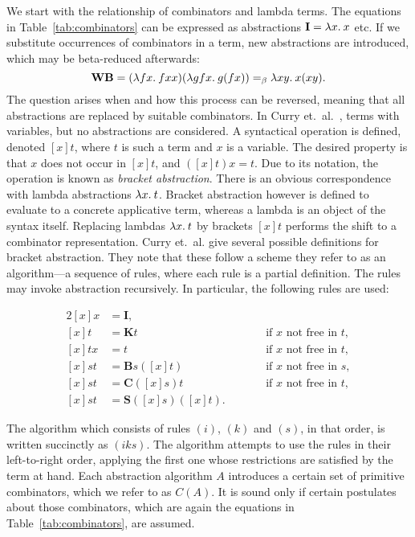 We start with the relationship of combinators and lambda terms.
The equations in Table~\ref{tab:combinators} can be expressed as abstractions
$\mathbf{I} = \lambda x.\>x$ etc.
If we substitute occurrences of combinators in a term, new abstractions are
introduced, which may be beta-reduced afterwards:
\[ \mathbf{WB} = (\lambda fx.\>fxx)(\lambda gfx.\>g(fx)) =_\beta \lambda xy.\>x(xy). \]
The question arises when and how this process can be reversed, meaning that
all abstractions are replaced by suitable combinators.
In Curry et.~al.~\cite[Section~6A]{curry68}, terms with variables, but no
abstractions are considered.
A syntactical operation is defined, denoted $[x]t$, where $t$ is such a term
and $x$ is a variable.
The desired property is that $x$ does not occur in $[x]t$, and
$([x]t)x = t$.  %
Due to its notation, the operation is known as \emph{bracket abstraction}.
There is an obvious correspondence with lambda abstractions $\lambda x.\>t$.
Bracket abstraction however is defined to evaluate to a concrete applicative
term, whereas a lambda is an object of the syntax itself. %
Replacing lambdas $\lambda x.\>t$ by brackets $[x]t$ performs the shift to a
combinator representation.
Curry et.\ al. give several possible definitions for bracket abstraction.
They note that these follow a scheme they refer to as an algorithm---a sequence
of rules, where each rule is a partial definition.
The rules may invoke abstraction recursively.
In particular, the following rules are used:

\begin{alignat}{2}
	\tag{$i$} [x]x &= \mathbf{I}, && \\
	\tag{$k$} [x]t &= \mathbf{K} t &&\qquad\text{if $x$ not free in $t$}, \\
	\tag{$\eta$} [x]tx &= t &&\qquad\text{if $x$ not free in $t$}, \\
	\tag{$b$} [x]st &= \mathbf{B}s([x]t) &&\qquad\text{if $x$ not free in $s$}, \\
	\tag{$c$} [x]st &= \mathbf{C}([x]s)t &&\qquad\text{if $x$ not free in $t$}, \\
	\tag{$s$} [x]st &= \mathbf{S}([x]s)([x]t). &&
\end{alignat}

The algorithm which consists of rules $(i)$, $(k)$ and $(s)$, in that order,
is written succinctly as $(iks)$.
The algorithm attempts to use the rules in their left-to-right order, applying
the first one whose restrictions are satisfied by the term at hand.
Each abstraction algorithm $A$ introduces a certain set of primitive combinators,
which we refer to as $C(A)$.
It is sound only if certain postulates about those combinators, which are again
the equations in Table~\ref{tab:combinators}, are assumed.

